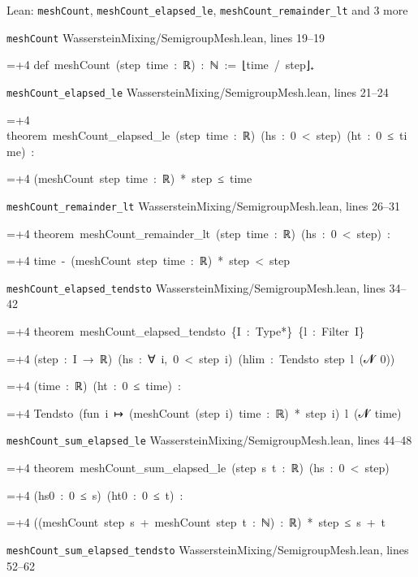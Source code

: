 \documentclass[11pt,a4paper]{article}
\newlength{\leancharwidth}
\newenvironment{leancode}{\par\smallskip\begingroup\ttfamily\footnotesize\raggedright
  \settowidth{\leancharwidth}{M}\setlength{\parskip}{0pt}\setlength{\parindent}{0pt}
  \frenchspacing}{\par\endgroup\smallskip}
\newcommand{\leanline}[2]{\hangindent=\dimexpr#1\leancharwidth+4\leancharwidth\relax
  \hangafter=1\noindent\hspace*{#1\leancharwidth}#2\par}
\newcommand{\leansource}[1]{\par{\footnotesize\color{leanmuted}#1}\par}
\begin{document}
\begin{leanbox}{Lean: \texttt{meshCount}, \texttt{meshCount\_\allowbreak{}elapsed\_\allowbreak{}le}, \texttt{meshCount\_\allowbreak{}remainder\_\allowbreak{}lt} and 3 more}
\leansource{\texttt{meshCount} \quad WassersteinMixing/\allowbreak{}SemigroupMesh.lean, lines 19–19}
\begin{leancode}
\leanline{0}{def\ meshCount\ (step\ time\ :\ ℝ)\ :\ ℕ\ :=\ ⌊time\ /\ step⌋₊}
\end{leancode}
\leansource{\texttt{meshCount\_\allowbreak{}elapsed\_\allowbreak{}le} \quad WassersteinMixing/\allowbreak{}SemigroupMesh.lean, lines 21–24}
\begin{leancode}
\leanline{0}{theorem\ meshCount\_elapsed\_le\ (step\ time\ :\ ℝ)\ (hs\ :\ 0\ <\ step)\ (ht\ :\ 0\ ≤\ time)\ :}
\leanline{4}{(meshCount\ step\ time\ :\ ℝ)\ *\ step\ ≤\ time}
\end{leancode}
\leansource{\texttt{meshCount\_\allowbreak{}remainder\_\allowbreak{}lt} \quad WassersteinMixing/\allowbreak{}SemigroupMesh.lean, lines 26–31}
\begin{leancode}
\leanline{0}{theorem\ meshCount\_remainder\_lt\ (step\ time\ :\ ℝ)\ (hs\ :\ 0\ <\ step)\ :}
\leanline{4}{time\ -\ (meshCount\ step\ time\ :\ ℝ)\ *\ step\ <\ step}
\end{leancode}
\leansource{\texttt{meshCount\_\allowbreak{}elapsed\_\allowbreak{}tendsto} \quad WassersteinMixing/\allowbreak{}SemigroupMesh.lean, lines 34–42}
\begin{leancode}
\leanline{0}{theorem\ meshCount\_elapsed\_tendsto\ \{I\ :\ Type*\}\ \{l\ :\ Filter\ I\}}
\leanline{4}{(step\ :\ I\ →\ ℝ)\ (hs\ :\ ∀\ i,\ 0\ <\ step\ i)\ (hlim\ :\ Tendsto\ step\ l\ ({\leanfallback 𝓝}\ 0))}
\leanline{4}{(time\ :\ ℝ)\ (ht\ :\ 0\ ≤\ time)\ :}
\leanline{4}{Tendsto\ (fun\ i\ ↦\ (meshCount\ (step\ i)\ time\ :\ ℝ)\ *\ step\ i)\ l\ ({\leanfallback 𝓝}\ time)}
\end{leancode}
\leansource{\texttt{meshCount\_\allowbreak{}sum\_\allowbreak{}elapsed\_\allowbreak{}le} \quad WassersteinMixing/\allowbreak{}SemigroupMesh.lean, lines 44–48}
\begin{leancode}
\leanline{0}{theorem\ meshCount\_sum\_elapsed\_le\ (step\ s\ t\ :\ ℝ)\ (hs\ :\ 0\ <\ step)}
\leanline{4}{(hs0\ :\ 0\ ≤\ s)\ (ht0\ :\ 0\ ≤\ t)\ :}
\leanline{4}{((meshCount\ step\ s\ +\ meshCount\ step\ t\ :\ ℕ)\ :\ ℝ)\ *\ step\ ≤\ s\ +\ t}
\end{leancode}
\leansource{\texttt{meshCount\_\allowbreak{}sum\_\allowbreak{}elapsed\_\allowbreak{}tendsto} \quad WassersteinMixing/\allowbreak{}SemigroupMesh.lean, lines 52–62}

\end{leanbox}
\end{document}
